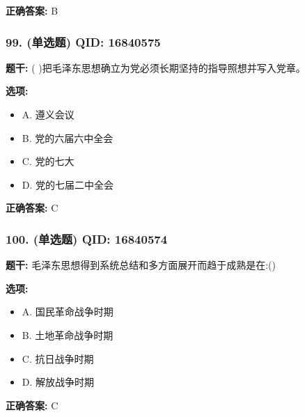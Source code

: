 \documentclass[12pt,UTF8]{ctexart}
\begin{document}
\textbf{正确答案:}
B

\vspace{0.3em}\hrulefill\vspace{0.7em}

\subsubsection*{99. (单选题) \small QID: 16840575}

\textbf{题干:}
( )把毛泽东思想确立为党必须长期坚持的指导照想并写入党章。

\textbf{选项:}
\begin{itemize}[leftmargin=*]

  \item A. 遵义会议

  \item B. 党的六届六中全会

  \item C. 党的七大

  \item D. 党的七届二中全会

\end{itemize}

\textbf{正确答案:}
C

\vspace{0.3em}\hrulefill\vspace{0.7em}

\subsubsection*{100. (单选题) \small QID: 16840574}

\textbf{题干:}
毛泽东思想得到系统总结和多方面展开而趋于成熟是在:()

\textbf{选项:}
\begin{itemize}[leftmargin=*]

  \item A. 国民革命战争时期

  \item B. 土地革命战争时期

  \item C. 抗日战争时期

  \item D. 解放战争时期

\end{itemize}

\textbf{正确答案:}
C

\vspace{0.3em}\hrulefill\vspace{0.7em}
\end{document}
